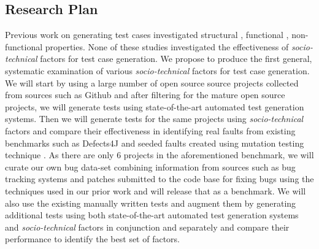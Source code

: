 \documentclass[10pt]{article}
\begin{document}
\subsection{Research Plan}

 Previous work on generating test cases investigated structural \cite{tonella2004evolutionary}, functional \cite{wegener2004evaluation}, non-functional \cite{wegener1998verifying} properties. %
None of these studies investigated the effectiveness of \emph{socio-technical} factors for test case generation. We propose to produce the first general, systematic examination of various \emph{socio-technical} factors for test case generation. We will start by using a large number of open source source projects collected from sources such as Github and after filtering for the mature open source projects, we will generate tests using state-of-the-art automated test generation systems. Then we will generate tests for the same projects using \emph{socio-technical} factors and compare their effectiveness in identifying real faults from existing benchmarks such as Defects4J \cite{just2014defects4j} and seeded faults created using mutation testing technique \cite{ahmed2017applying}. As there are only 6 projects in the aforementioned benchmark, we will curate our own bug data-set combining information from  sources such as bug tracking systems and patches submitted to the code base for fixing bugs using the techniques used in our prior work \cite{ahmed2016can} and will release that as a benchmark. 
We will also use the existing manually written tests and augment them by generating additional tests using both state-of-the-art automated test generation systems and \emph{socio-technical} factors in conjunction and separately and compare their performance to identify the best set of factors.
\end{document}
